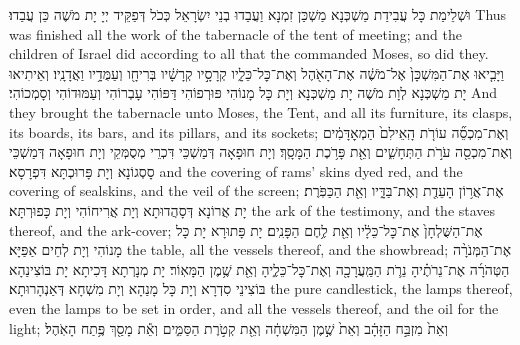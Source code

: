 {וּשְׁלֵימַת כָּל עֲבִידַת מַשְׁכְּנָא מַשְׁכַּן זִמְנָא וַעֲבַדוּ בְנֵי יִשְׂרָאֵל כְּכֹל דְּפַקֵּיד יְיָ יָת מֹשֶׁה כֵּן עֲבַדוּ׃}
{Thus was finished all the work of the tabernacle of the tent of meeting; and the children of Israel did according to all that the \lord\space commanded Moses, so did they.}{}
{וַיָּבִ֤יאוּ אֶת־הַמִּשְׁכָּן֙ אֶל־מֹשֶׁ֔ה אֶת־הָאֹ֖הֶל וְאֶת־כׇּל־כֵּלָ֑יו קְרָסָ֣יו קְרָשָׁ֔יו בְּרִיחָ֖ו וְעַמֻּדָ֥יו וַאֲדָנָֽיו׃
}
{וְאֵיתִיאוּ יָת מַשְׁכְּנָא לְוָת מֹשֶׁה יָת מַשְׁכְּנָא וְיָת כָּל מָנוֹהִי פּוּרְפוֹהִי דַּפּוֹהִי עָבְרוֹהִי וְעַמּוּדוֹהִי וְסָמְכוֹהִי׃}
{And they brought the tabernacle unto Moses, the Tent, and all its furniture, its clasps, its boards, its bars, and its pillars, and its sockets;}{}
{וְאֶת־מִכְסֵ֞ה עוֹרֹ֤ת הָֽאֵילִם֙ הַמְאׇדָּמִ֔ים וְאֶת־מִכְסֵ֖ה עֹרֹ֣ת הַתְּחָשִׁ֑ים וְאֵ֖ת פָּרֹ֥כֶת הַמָּסָֽךְ׃}
{וְיָת חוּפָאָה דְּמַשְׁכֵּי דִּכְרֵי מְסֻמְּקֵי וְיָת חוּפָאָה דְּמַשְׁכֵּי סָסְגוֹנָא וְיָת פָּרוּכְתָּא דִּפְרָסָא׃}
{and the covering of rams’ skins dyed red, and the covering of sealskins, and the veil of the screen;}{}
{אֶת־אֲר֥וֹן הָעֵדֻ֖ת וְאֶת־בַּדָּ֑יו וְאֵ֖ת הַכַּפֹּֽרֶת׃}
{יָת אֲרוֹנָא דְּסָהֲדוּתָא וְיָת אֲרִיחוֹהִי וְיָת כָּפוּרְתָּא׃}
{the ark of the testimony, and the staves thereof, and the ark-cover;}{}
{אֶת־הַשֻּׁלְחָן֙ אֶת־כׇּל־כֵּלָ֔יו וְאֵ֖ת לֶ֥חֶם הַפָּנִֽים׃}
{יָת פָּתוּרָא יָת כָּל מָנוֹהִי וְיָת לְחֵים אַפַּיָּא׃}
{the table, all the vessels thereof, and the showbread;}{}
{אֶת־הַמְּנֹרָ֨ה הַטְּהֹרָ֜ה אֶת־נֵרֹתֶ֗יהָ נֵרֹ֛ת הַמַּֽעֲרָכָ֖ה וְאֶת־כׇּל־כֵּלֶ֑יהָ וְאֵ֖ת שֶׁ֥מֶן הַמָּאֽוֹר׃}
{יָת מְנָרְתָא דָּכִיתָא יָת בּוֹצִינַהָא בּוֹצִינֵי סִדְרָא וְיָת כָּל מָנַהָא וְיָת מִשְׁחָא דְּאַנְהָרוּתָא׃}
{the pure candlestick, the lamps thereof, even the lamps to be set in order, and all the vessels thereof, and the oil for the light;}{}
{וְאֵת֙ מִזְבַּ֣ח הַזָּהָ֔ב וְאֵת֙ שֶׁ֣מֶן הַמִּשְׁחָ֔ה וְאֵ֖ת קְטֹ֣רֶת הַסַּמִּ֑ים וְאֵ֕ת מָסַ֖ךְ פֶּ֥תַח הָאֹֽהֶל׃}
